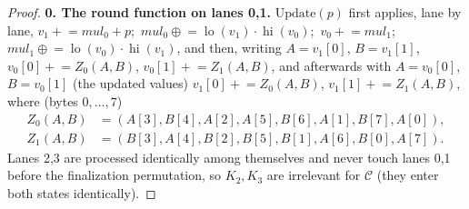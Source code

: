 \begin{proof}
\textbf{0. The round function on lanes 0,1.}
$\mathrm{Update}(p)$ first applies, lane by lane,
$v_1\mathrel{+}=\mathit{mul}_0+p$;\ $\mathit{mul}_0\mathrel{\oplus}=\operatorname{lo}(v_1)\cdot\operatorname{hi}(v_0)$;\
$v_0\mathrel{+}=\mathit{mul}_1$;\ $\mathit{mul}_1\mathrel{\oplus}=\operatorname{lo}(v_0)\cdot\operatorname{hi}(v_1)$,
and then, writing $A=v_1[0]$, $B=v_1[1]$,
$v_0[0]\mathrel{+}=Z_0(A,B)$, $v_0[1]\mathrel{+}=Z_1(A,B)$, and afterwards with $A=v_0[0]$, $B=v_0[1]$ (the
updated values) $v_1[0]\mathrel{+}=Z_0(A,B)$, $v_1[1]\mathrel{+}=Z_1(A,B)$, where (bytes $0,\dots,7$)
\begin{align*}
Z_0(A,B)&=(A[3],B[4],A[2],A[5],B[6],A[1],B[7],A[0]),\\
Z_1(A,B)&=(B[3],A[4],B[2],B[5],B[1],A[6],B[0],A[7]).
\end{align*}
Lanes 2,3 are processed identically among themselves and never touch lanes 0,1 before the finalization
permutation, so $K_2,K_3$ are irrelevant for $\mathcal C$ (they enter both states identically).


\end{proof}
